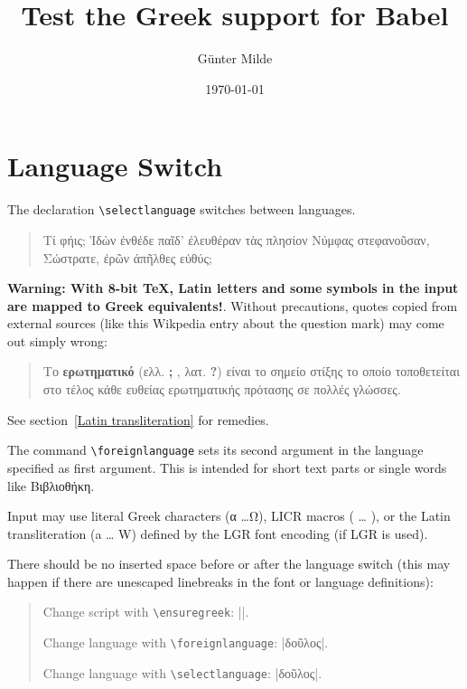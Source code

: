 \documentclass[a4paper]{article}
\newcommand{\cs}[1]{\texttt{\textbackslash#1}}
\begin{document}
\title{Test the Greek support for Babel}
\author{Günter Milde}
\date{\today}
\maketitle

\SETUPDOC %

\tableofcontents


\section{Language Switch}

The declaration \verb|\selectlanguage| switches between languages.

\begin{quote}
  Τί φήις; Ἱδὼν ἐνθέδε παῖδ’ ἐλευθέραν
  τὰς πλησίον Νύμφας στεφανοῦσαν, Σώστρατε,
  ἐρῶν άπῆλθες εὐθύς;
\end{quote}

\textbf{Warning: With 8-bit TeX, Latin letters and some symbols in the input
are mapped to Greek equivalents!}.
Without precautions, quotes copied from external sources (like this Wikpedia
entry about the question mark) may come out simply wrong:
\begin{quote}
  Το \textbf{ερωτηματικό} (ελλ. \textbf{;} , λατ. \textbf{?}) είναι το
  σημείο στίξης το οποίο τοποθετείται στο τέλος κάθε ευθείας ερωτηματικής
  πρότασης σε πολλές γλώσσες.
\end{quote}
See section~\ref{Latin transliteration} for remedies.

The command \verb|\foreignlanguage| sets its second argument in the language
specified as first argument. This is intended for short text parts or
single words like \foreignlanguage{greek}{Βιβλιοθήκη}.

Input may use literal Greek characters (\foreignlanguage{greek}{α \ldots Ω}),
LICR macros (\foreignlanguage{greek}{\textalpha{} \ldots{} \textOmega}),
or the Latin transliteration (\foreignlanguage{greek}{a \ldots{} W}) defined
by the LGR font encoding (if LGR is used).

There should be no inserted space before or after the language switch (this
may happen if there are unescaped linebreaks in the font or language
definitions):
\begin{quotation}
  Change script with \cs{ensuregreek}: ||.

  Change language with \cs{foreignlanguage}:
  	 	       |\foreignlanguage{greek}{δοῦλος}|.

  Change language with \cs{selectlanguage}:
                       |δοῦλος|.
\end{quotation}
\end{document}
